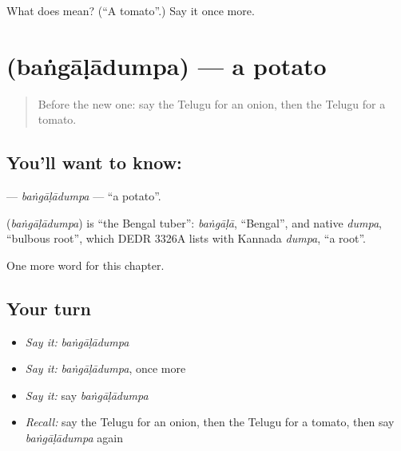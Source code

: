 \begin{tcolorbox}[breakable,colback=teal!4,colframe=teal!35!black,title={Before you move on}]
What does  mean? (\textquotedblleft{}A tomato\textquotedblright{}.) Say it once more.
\end{tcolorbox}
\section[\texorpdfstring{\te{బంగాళాదుంప} (baṅgāḷādumpa)}{బంగాళాదుంప (baṅgāḷādumpa)}]{ (baṅgāḷādumpa) — a potato}

\label{lesson:TE-C118-bangaladumpa}



\begin{quote}
Before the new one: say the Telugu for an onion, then the Telugu for a tomato.
\end{quote}

\subsection*{You'll want to know: }
\textbf{} — \emph{baṅgāḷādumpa} — \textquotedblleft{}a potato\textquotedblright{}.

\begin{cousinweb}
\textbf{} (\emph{baṅgāḷādumpa}) is \textquotedblleft{}the Bengal tuber\textquotedblright{}: \emph{baṅgāḷā}, \textquotedblleft{}Bengal\textquotedblright{}, and native \emph{dumpa}, \textquotedblleft{}bulbous root\textquotedblright{}, which DEDR 3326A lists with Kannada \emph{dumpa}, \textquotedblleft{}a root\textquotedblright{}.
\end{cousinweb}

\begin{grammarlens}[title={What you've built}]
One more word for this chapter.
\end{grammarlens}

\subsection*{Your turn}
\begin{itemize}
\raggedright
  \item \emph{Say it:} \emph{baṅgāḷādumpa}
  \item \emph{Say it:} \emph{baṅgāḷādumpa}, once more
  \item \emph{Say it:} say \emph{baṅgāḷādumpa}
  \item \emph{Recall:} say the Telugu for an onion, then the Telugu for a tomato, then say \emph{baṅgāḷādumpa} again
\end{itemize}

